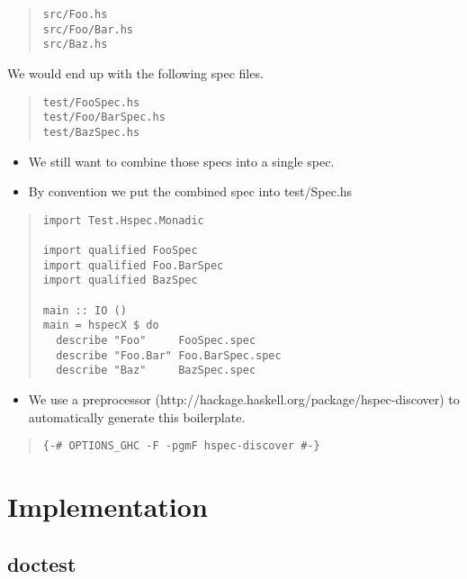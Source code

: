 \documentclass[preprint]{sigplanconf}
\begin{document}
\begin{quote}
\begin{verbatim}
src/Foo.hs
src/Foo/Bar.hs
src/Baz.hs
\end{verbatim}
\end{quote}

\noindent We would end up with the following spec files.

\begin{quote}
\begin{verbatim}
test/FooSpec.hs
test/Foo/BarSpec.hs
test/BazSpec.hs
\end{verbatim}
\end{quote}

\begin{itemize}
\item We still want to combine those specs into a single spec.
\item By convention we put the combined spec into test/Spec.hs
\end{itemize}

\begin{quote}
\begin{verbatim}
import Test.Hspec.Monadic

import qualified FooSpec
import qualified Foo.BarSpec
import qualified BazSpec

main :: IO ()
main = hspecX $ do
  describe "Foo"     FooSpec.spec
  describe "Foo.Bar" Foo.BarSpec.spec
  describe "Baz"     BazSpec.spec
\end{verbatim}
\end{quote}

\begin{itemize}
\item We use a preprocessor (http://hackage.haskell.org/package/hspec-discover) to automatically generate this boilerplate.
\end{itemize}

\begin{quote}
\begin{verbatim}
{-# OPTIONS_GHC -F -pgmF hspec-discover #-}
\end{verbatim}
\end{quote}

\section{Implementation}

\subsection{doctest}
\end{document}
